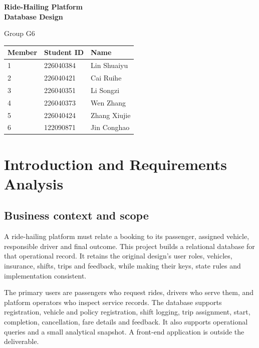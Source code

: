 \documentclass[11pt,a4paper]{article}
\begin{document}
\begin{titlepage}\thispagestyle{empty}\centering\vspace*{2cm}
{\fontsize{26}{34}\selectfont\bfseries Ride-Hailing Platform\\[4pt]Database Design\par}\vspace{1.1cm}
{\Large Group G6\par}\vspace{1.2cm}
\par\begingroup\small\noindent
\begin{tabularx}{\linewidth}{p{2cm}p{4cm}p{4cm}}
\toprule
Member & Student ID & Name\\\midrule
1 & 226040384 & Lin Shuaiyu\\
2 & 226040421 & Cai Ruihe\\
3 & 226040351 & Li Songzi\\
4 & 226040373 & Wen Zhang\\
5 & 226040424 & Zhang Xiujie\\
6 & 122090871 & Jin Conghao\\
\bottomrule
\end{tabularx}
\par\endgroup
\end{titlepage}
\renewcommand{\contentsname}{Contents}
\begingroup\small\setlength{\parskip}{0pt}\tableofcontents\endgroup\clearpage{}
\section{Introduction and Requirements Analysis}
\subsection{Business context and scope}
A ride-hailing platform must relate a booking to its passenger, assigned vehicle, responsible driver and final outcome. This project builds a relational database for that operational record. It retains the original design's user roles, vehicles, insurance, shifts, trips and feedback, while making their keys, state rules and implementation consistent.

The primary users are passengers who request rides, drivers who serve them, and platform operators who inspect service records. The database supports registration, vehicle and policy registration, shift logging, trip assignment, start, completion, cancellation, fare details and feedback. It also supports operational queries and a small analytical snapshot. A front-end application is outside the deliverable.
\end{document}
